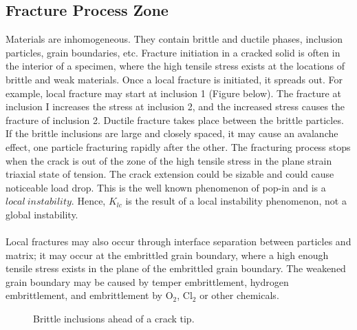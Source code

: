 \documentclass[12pt]{article}
\begin{document}
\subsection{Fracture Process Zone}
Materials are inhomogeneous. They contain brittle and ductile phases, inclusion particles, grain
boundaries, etc. Fracture initiation in a cracked solid is often in the interior of a specimen, where the
high tensile stress exists at the locations of brittle and weak materials. Once a local fracture is initiated,
it spreads out. For example, local fracture may start at inclusion 1 (Figure below). The fracture at inclusion I
increases the stress at inclusion 2, and the increased stress causes the fracture of inclusion 2. Ductile
fracture takes place between the brittle particles. If the brittle inclusions are large and closely spaced, it
may cause an avalanche effect, one particle fracturing rapidly after the other. The fracturing process
stops when the crack is out of the zone of the high tensile stress in the plane strain triaxial state of
tension. The crack extension could be sizable and could cause noticeable load drop. This is the well
known phenomenon of pop-in and is a $local\  instability$. Hence, $K_{lc}$ is the result of a local instability
phenomenon, not a global instability.
\\\\
Local fractures may also occur through interface separation between particles and matrix; it may
occur at the embrittled grain boundary, where a high enough tensile stress exists in the plane of the
embrittled grain boundary. The weakened grain boundary may be caused by temper embrittlement,
hydrogen embrittlement, and embrittlement by $\text{O}_\text{2}$, $\text{Cl}_\text{2}$ or other chemicals.

\begin{figure}[H]
    \centering
    \captionsetup{labelformat=empty}
    \caption{Brittle inclusions ahead of a crack tip.}
\end{figure}
\end{document}
